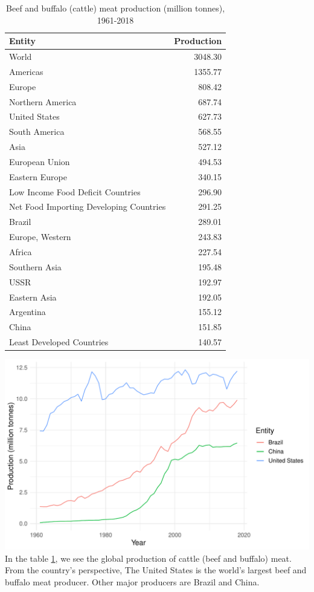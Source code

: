 \documentclass[11pt,a4paper,]{article}
\begin{document}
\begin{table}

\caption{\label{tab:cattle}Beef and buffalo (cattle) meat production (million tonnes), 1961-2018}
\centering
\begin{tabular}[t]{lr}
\toprule
Entity & Production\\
\midrule
World & 3048.30\\
Americas & 1355.77\\
Europe & 808.42\\
Northern America & 687.74\\
United States & 627.73\\
\addlinespace
South America & 568.55\\
Asia & 527.12\\
European Union & 494.53\\
Eastern Europe & 340.15\\
Low Income Food Deficit Countries & 296.90\\
\addlinespace
Net Food Importing Developing Countries & 291.25\\
Brazil & 289.01\\
Europe, Western & 243.83\\
Africa & 227.54\\
Southern Asia & 195.48\\
\addlinespace
USSR & 192.97\\
Eastern Asia & 192.05\\
Argentina & 155.12\\
China & 151.85\\
Least Developed Countries & 140.57\\
\bottomrule
\end{tabular}
\end{table}

\includegraphics{report_files/figure-latex/cattle-1.pdf}
In the table \ref{tab:cattle}, we see the global production of cattle (beef and buffalo) meat. From the country's perspective, The United States is the world's largest beef and buffalo meat producer. Other major producers are Brazil and China.
\end{document}
